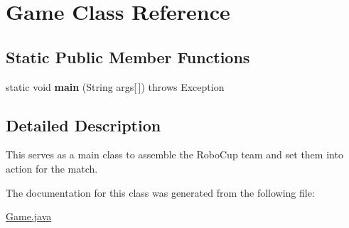 \hypertarget{classGame}{
\section{Game Class Reference}
\label{classGame}
}
\subsection*{Static Public Member Functions}
\begin{DoxyCompactItemize}
\item 
\hypertarget{classGame_a3320680a7bc7941aed1594a923181205}{
static void {\bfseries main} (String args\mbox{[}$\,$\mbox{]})  throws Exception 	}
\label{classGame_a3320680a7bc7941aed1594a923181205}

\end{DoxyCompactItemize}


\subsection{Detailed Description}
This serves as a main class to assemble the RoboCup team and set them into action for the match. 

The documentation for this class was generated from the following file:\begin{DoxyCompactItemize}
\item 
\hyperlink{Game_8java}{Game.java}\end{DoxyCompactItemize}
